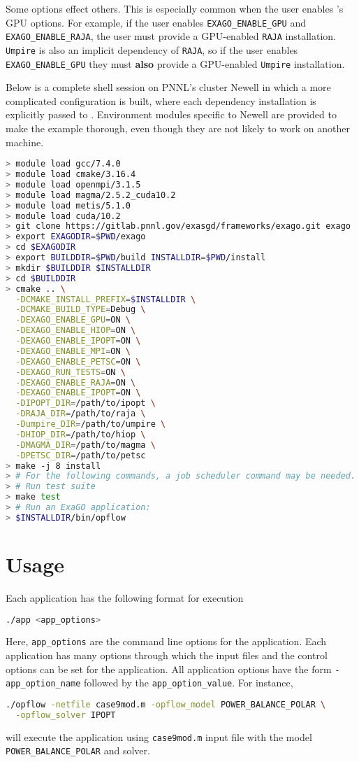 Some \cmake options effect others.
This is especially common when the user enables \exago's GPU options.
For example, if the user enables \texttt{EXAGO\_ENABLE\_GPU} and \texttt{EXAGO\_ENABLE\_RAJA}, the user must provide a GPU-enabled \texttt{RAJA} installation.
\texttt{Umpire} is also an implicit dependency of \texttt{RAJA}, so if the user enables \texttt{EXAGO\_ENABLE\_GPU} they must \textbf{also} provide a GPU-enabled \texttt{Umpire} installation.

Below is a complete shell session on PNNL's cluster Newell in which a more complicated \exago configuration is built, where each dependency installation is explicitly passed to \cmake.
Environment modules specific to Newell are provided to make the example thorough, even though they are not likely to work on another machine.

\begin{lstlisting}[language=bash,caption={\exago build with all options enabled}]
> module load gcc/7.4.0
> module load cmake/3.16.4
> module load openmpi/3.1.5
> module load magma/2.5.2_cuda10.2
> module load metis/5.1.0
> module load cuda/10.2
> git clone https://gitlab.pnnl.gov/exasgd/frameworks/exago.git exago
> export EXAGODIR=$PWD/exago
> cd $EXAGODIR
> export BUILDDIR=$PWD/build INSTALLDIR=$PWD/install
> mkdir $BUILDDIR $INSTALLDIR
> cd $BUILDDIR
> cmake .. \
  -DCMAKE_INSTALL_PREFIX=$INSTALLDIR \
  -DCMAKE_BUILD_TYPE=Debug \
  -DEXAGO_ENABLE_GPU=ON \
  -DEXAGO_ENABLE_HIOP=ON \
  -DEXAGO_ENABLE_IPOPT=ON \
  -DEXAGO_ENABLE_MPI=ON \
  -DEXAGO_ENABLE_PETSC=ON \
  -DEXAGO_RUN_TESTS=ON \
  -DEXAGO_ENABLE_RAJA=ON \
  -DEXAGO_ENABLE_IPOPT=ON \
  -DIPOPT_DIR=/path/to/ipopt \
  -DRAJA_DIR=/path/to/raja \
  -Dumpire_DIR=/path/to/umpire \
  -DHIOP_DIR=/path/to/hiop \
  -DMAGMA_DIR=/path/to/magma \
  -DPETSC_DIR=/path/to/petsc
> make -j 8 install
> # For the following commands, a job scheduler command may be needed.
> # Run test suite
> make test
> # Run an ExaGO application:
> $INSTALLDIR/bin/opflow
\end{lstlisting}

\section{Usage}

Each \exago application has the following format for execution
\begin{lstlisting}[language=bash]
  ./app <app_options>
\end{lstlisting}
Here, \lstinline{app_options} are the command line options for the application. Each application has many options through which the input files and the control options can be set for the application. All application options have the form \lstinline{-app_option_name} followed by the \lstinline{app_option_value}. 
For instance,
\begin{lstlisting}[language=bash]
  ./opflow -netfile case9mod.m -opflow_model POWER_BALANCE_POLAR \
  -opflow_solver IPOPT
\end{lstlisting}
will execute the \opflow application using \lstinline{case9mod.m} input file with the model \lstinline{POWER_BALANCE_POLAR} and \ipopt solver.

